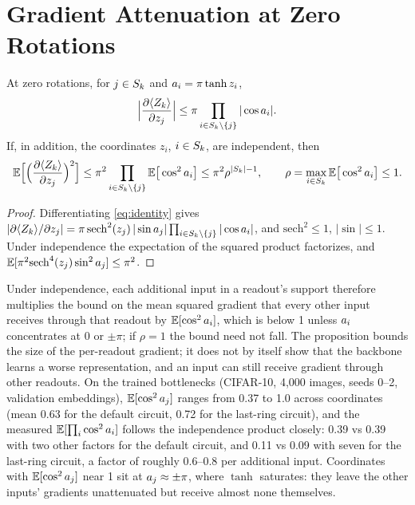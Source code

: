 \section{Gradient Attenuation at Zero Rotations}
\label{app:attenuation}

\begin{proposition}\label{prop:atten}
At zero rotations, for $j\in S_k$ and $a_{i}=\pi\tanh z_i$,
\begin{equation*}
  \Big|\frac{\partial \langle Z_{k}\rangle}{\partial z_j}\Big| \le \pi\prod_{i\in S_k\setminus\{j\}}|\cos a_{i}| .
\end{equation*}
If, in addition, the coordinates $z_i$, $i\in S_k$, are independent, then
\begin{equation*}
  \mathbb{E}\Big[\Big(\frac{\partial \langle Z_{k}\rangle}{\partial z_j}\Big)^2\Big]
  \le \pi^2\prod_{i\in S_k\setminus\{j\}}\mathbb{E}\big[\cos^2a_{i}\big]
  \le \pi^2\rho^{|S_k|-1},\qquad \rho=\max_{i\in S_k}\mathbb{E}\big[\cos^2a_{i}\big]\le1 .
\end{equation*}
\end{proposition}
\begin{proof}
Differentiating \cref{eq:identity} gives
$|\partial\langle Z_{k}\rangle/\partial z_j|=\pi\,\mathrm{sech}^2(z_j)\,|\sin a_{j}|\prod_{i\in S_k\setminus\{j\}}|\cos a_{i}|$,
and $\mathrm{sech}^2\le1$, $|\sin|\le1$. Under independence the expectation of the squared product
factorizes, and $\mathbb{E}[\pi^2\mathrm{sech}^4(z_j)\sin^2a_{j}]\le\pi^2$.
\end{proof}

Under independence, each additional input in a readout's support therefore multiplies the bound
on the mean squared gradient that every other input receives through that readout by
$\mathbb{E}[\cos^2a_{i}]$, which is below 1 unless $a_{i}$ concentrates at $0$ or $\pm\pi$; if
$\rho=1$ the bound need not fall. The proposition bounds the size of the
per-readout gradient; it does not by itself show that the backbone learns a worse representation,
and an input can still receive gradient through other readouts. On the trained bottlenecks
(CIFAR-10, 4,000 images, seeds 0--2, validation embeddings), $\mathbb{E}[\cos^2a_{j}]$ ranges from
0.37 to 1.0 across coordinates (mean 0.63 for the default circuit, 0.72 for the last-ring
circuit), and the measured $\mathbb{E}[\prod_{i}\cos^2a_{i}]$ follows the independence product
closely: 0.39 vs 0.39 with two other factors for the default circuit, and 0.11 vs 0.09 with
seven for the last-ring circuit, a factor of roughly 0.6--0.8 per additional input. Coordinates
with $\mathbb{E}[\cos^2a_{j}]$ near 1 sit at $a_{j}\approx\pm\pi$, where $\tanh$ saturates: they leave
the other inputs' gradients unattenuated but receive almost none themselves.

